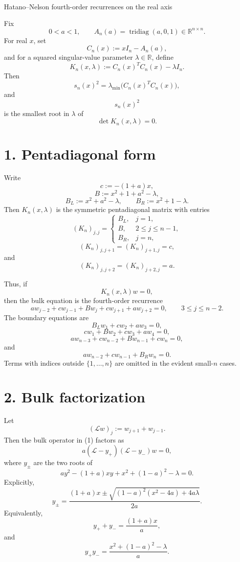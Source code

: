 \documentclass[11pt]{article}
\newcommand{\RR}{\mathbb R}
\newcommand{\tridiag}{\operatorname{tridiag}}
\begin{document}
\begin{center}
{\Large Hatano--Nelson fourth-order recurrences on the real axis}
\end{center}

Fix
\[
0<a<1,\qquad
A_n(a)=\tridiag(a,0,1)\in\RR^{n\times n}.
\]
For real \(x\), set
\[
C_n(x):=xI_n-A_n(a),
\]
and for a squared singular-value parameter \(\lambda\in\RR\), define
\[
K_n(x,\lambda):=C_n(x)^TC_n(x)-\lambda I_n.
\]
Then
\[
s_n(x)^2=\lambda_{\min}\bigl(C_n(x)^TC_n(x)\bigr),
\]
and
\[
s_n(x)^2
\]
is the smallest root in \(\lambda\) of
\[
\det K_n(x,\lambda)=0.
\]

\section*{1. Pentadiagonal form}

Write
\[
c:=-(1+a)x,
\]
\[
B:=x^2+1+a^2-\lambda,
\]
\[
B_L:=x^2+a^2-\lambda,
\qquad
B_R:=x^2+1-\lambda.
\]
Then \(K_n(x,\lambda)\) is the symmetric pentadiagonal matrix with entries
\[
(K_n)_{j,j}=
\begin{cases}
B_L, & j=1,\\
B, & 2\le j\le n-1,\\
B_R, & j=n,
\end{cases}
\]
\[
(K_n)_{j,j+1}=(K_n)_{j+1,j}=c,
\]
and
\[
(K_n)_{j,j+2}=(K_n)_{j+2,j}=a.
\]

Thus, if
\[
K_n(x,\lambda)w=0,
\]
then the bulk equation is the fourth-order recurrence
\[
\boxed{
a w_{j-2}
+c w_{j-1}
+B w_j
+c w_{j+1}
+a w_{j+2}=0,
\qquad
3\le j\le n-2.
}
\tag{1}
\]
The boundary equations are
\[
\boxed{
B_Lw_1+cw_2+aw_3=0,
}
\tag{2}
\]
\[
\boxed{
cw_1+Bw_2+cw_3+aw_4=0,
}
\tag{3}
\]
\[
\boxed{
aw_{n-3}+cw_{n-2}+Bw_{n-1}+cw_n=0,
}
\tag{4}
\]
and
\[
\boxed{
aw_{n-2}+cw_{n-1}+B_Rw_n=0.
}
\tag{5}
\]
Terms with indices outside \(\{1,\dots,n\}\) are omitted in the evident small-\(n\) cases.

\section*{2. Bulk factorization}

Let
\[
(\mathcal L w)_j:=w_{j+1}+w_{j-1}.
\]
Then the bulk operator in (1) factors as
\[
\boxed{
a(\mathcal L-y_+)(\mathcal L-y_-)w=0,
}
\tag{6}
\]
where \(y_\pm\) are the two roots of
\[
a y^2-(1+a)xy+x^2+(1-a)^2-\lambda=0.
\]
Explicitly,
\[
\boxed{
y_\pm=
\frac{(1+a)x
\pm
\sqrt{(1-a)^2(x^2-4a)+4a\lambda}}
{2a}.
}
\tag{7}
\]
Equivalently,
\[
\boxed{
y_++y_-=\frac{(1+a)x}{a},
}
\tag{8}
\]
and
\[
\boxed{
y_+y_-=
\frac{x^2+(1-a)^2-\lambda}{a}.
}
\tag{9}
\]
\end{document}
